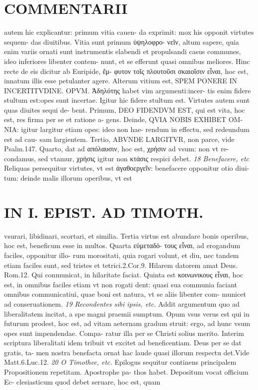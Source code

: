 \documentclass{article}
\begin{document}
\begin{pages}
\section*{COMMENTARII }
\marginpar{[ p.168 ]}\pstart autem hic explicantur: primum vitia cauen- da exprimit: mox his opponit virtutes sequem- das diuitibus. Vitia sunt primum ὑψηλοφρο- νεῖν, altum sapere, quia enim variis ornati sunt instrumentis elabendi et propulsandi casus communes, ideo inferiores libenter contem- nunt, et se efferunt quasi omnibus meliores.  \pend\pstart Hinc recte de eis dicitur ab Euripide, ἔμ- φυτον τοῖς πλουτοῦσι σκαιοῖσιν εἶναι, hoc est, innatum illis esse petulanter agere. Alterum vitium est, SPEM PONERE IN INCERTITVDINE. OPVM. Ἀδηλότης  habet vim argumenti:incer- tis enim fidere stultum est:opes sunt incertae. Igitur hic fidere stultum est.  \pend\pstart Virtutes autem sunt quas diuites sequi de- bent. Primum, DEO FIDENDVM EST, qui est vita, hoc est, res firma per se et ratione a- gens. Deinde, QVIA NOBIS EXHIBET OM- NIA: igitur largitur etiam opes: ideo non hae- rendum in effectu, sed redeundum est ad cau- sam largientem. Tertio, ABVNDE LARGITVR, non parce, vide Psalm.147. Quarto, dat ad απόλαυσιν, hoc est, χρήσιν ad vsum: non vt re- condamus, sed vtamur, χρήσις igitur non κτάσις respici debet.  \pend
\textit{18 Benefacere, etc }\pstart Reliquas persequitur virtutes, vt est ἀγαθοεργεῖν: benefacere opponitur otio diui- tum: deinde malis illorum operibus, vt est  \pend
\section*{IN I. EPIST. AD TIMOTH. }
\marginpar{[ p.169 ]}\pstart vsurari, libidinari, scortari, et similia. Tertia virtus est abundare bonis operibus, hoc est, beneficum esse in multos. Quarta εὐμεταδό- τους εἶναι, ad erogandum faciles, opponitur illo- rum morositati, quia rogari volunt, et diu, nec tandem etiam faciles sunt, sed tristes et tetrici.2.Cor.9. Hilarem datorem amat Deus. Rom.12. Qui conmunicat, in hilaritate faciat. Quinta est κοινωνικους εἶναι, hoc est, in omnibus faciles etiam vt non rogati dent: quasi sua communia faciant omnibus communicatiui, quae boni est natura, vt se aliis libenter com- municet ad conseruationem.  \pend
\textit{19 Recondentes sibi ipsis, etc. }\pstart Addit argumentum quo ad liberalitatem incitat, a spe magni praemii sumptum. Opum vsus verus est qui in futurum prodest, hoc est, ad vitam aeternam gradum struit: ergo, ad hunc vsum opes sunt impendendae. Compa- ratur illa per se Christi solius merito. Interim scriptura liberalitati idem tribuit vt excitet ad beneficentiam. Deus per se dat gratis, ta- men nostra benefacta ornat hac laude quasi illorum respectu det.Vide Matt.6.Luc.12.  \pend
\textit{20 O Timothee, etc. }\pstart Epilogus sequitur continens principalem Propositionem repetitam. Apostrophe pa- thos habet. Depositum vocat officium Ec- clesiasticum quod debet seruare, hoc est, quam  \pend

\end{pages}
\end{document}
